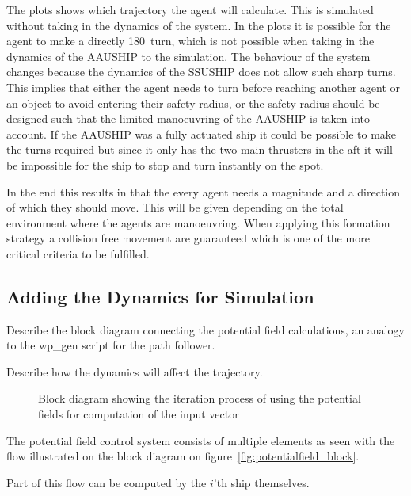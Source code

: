The plots shows which trajectory the agent will calculate. This is simulated without taking in the dynamics of the system. In the plots it is possible for the agent to make a directly 180\textdegree\ turn, which is not possible when taking in the dynamics of the AAUSHIP to the simulation. The behaviour of the system changes because the dynamics of the SSUSHIP does not allow such sharp turns. This implies that either the agent needs to turn before reaching another agent or an object to avoid entering their safety radius, or the safety radius should be designed such that the limited manoeuvring of the AAUSHIP is taken into account. If the AAUSHIP was a fully actuated ship it could be possible to make the turns required but since it only has the two main thrusters in the aft it will be impossible for the ship to stop and turn instantly on the spot.

In the end this results in that the every agent needs a magnitude and a direction of which they should move. This will be given depending on the total environment where the agents are manoeuvring. When applying this formation strategy a collision free movement are guaranteed which is one of the more critical criteria to be fulfilled. 

\subsection{Adding the Dynamics for Simulation}
Describe the block diagram connecting the potential field calculations,
an analogy to the wp\_gen script for the path follower.

Describe how the dynamics will affect the trajectory.

\begin{figure}[htbp]
\centering

\caption{Block diagram showing the iteration process of using the
potential fields for computation of the input vector}
\label{fig:potentialfield_block}
\end{figure}

The potential field control system consists of multiple elements
as seen with the flow illustrated on the block diagram on
figure~\vref{fig:potentialfield_block}.

Part of this flow can be computed by the $i$'th ship themselves.

